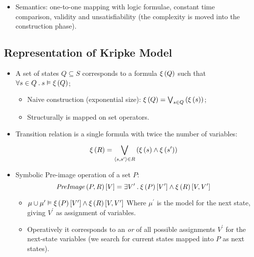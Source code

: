 \begin{itemize}
    \item   Semantics: one-to-one mapping with logic formulae, constant
            time comparison, validity and unsatisfiability (the complexity
            is moved into the construction phase).

    \end{itemize}

\subsection{Representation of Kripke Model}

    \begin{itemize}

    \item   A set of states $Q \subseteq S$ corresponds to a formula
            $\xi\left({Q}\right)$ such that $\forall s \in Q \:.\: s \vDash
            \xi\left({Q}\right)$;

        \begin{itemize}
        \item   Naive construction (exponential size):
                $\xi\left({Q}\right) = \bigvee_{s \in Q}^{}\left({\xi\left({s}\right)}\right)$;
        \item   Structurally is mapped on set operators.
        \end{itemize}

    \item   Transition relation is a single formula with
            twice the number of variables:
        \[
        \xi\left({R}\right) = \bigvee_{\left<{s, s^\prime}\right> \in R}^{}\left({\xi\left({s}\right) \wedge \xi\left({s^\prime}\right)}\right)
        \]

    \item   Symbolic Pre-image operation of a set $P$:
        \[
        \mbox{\emph{PreImage}}\left({P, R}\right)[V] = \exists V^\prime \:.\: \xi\left({P}\right)[V^\prime]
                             \wedge \xi\left({R}\right)[V, V^\prime]
        \]
        \begin{itemize}

        \item   $\mu \cup \mu^\prime \vDash \xi\left({P}\right)[V^\prime]
                            \wedge \xi\left({R}\right)[V, V^\prime]$
                Where $\mu^\prime$ is the model for the next state, giving
                $V^\prime$ as assignment of variables.

        \item   Operatively it corresponds to an \emph{or} of all possible
                assignments $V^\prime$ for the next-state variables (we
                search for current states mapped into $P$ as next states).


\end{itemize}
\end{itemize}
